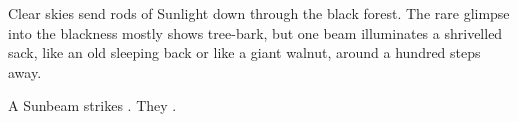 \begin{boxtext}
  Clear skies send rods of Sunlight down through the black forest.
  The rare glimpse into the blackness mostly shows tree-bark, but one beam illuminates a shrivelled sack, like an old sleeping back or like a giant walnut, around a hundred \glspl{step} away.
\end{boxtext}

A Sunbeam strikes .
They .

